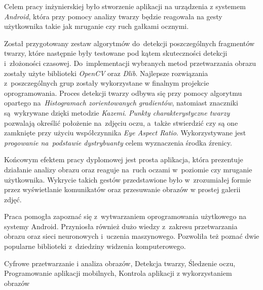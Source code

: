  \cleardoublepage %
 \streszczenie
 
 Celem pracy inżynierskiej było stworzenie aplikacji na urządzenia z systemem \textit{Android}, która przy pomocy analizy twarzy będzie reagowała na gesty użytkownika takie jak mruganie czy ruch gałkami ocznymi.
 
 \par
 
 Został przygotowany zestaw algorytmów do~detekcji poszczególnych fragmentów twarzy, które następnie były testowane pod kątem skuteczności detekcji i~złożoności czasowej. Do~implementacji wybranych metod przetwarzania obrazu zostały użyte biblioteki \textit{OpenCV} oraz \textit{Dlib}.
 Najlepsze rozwiązania z~poszczególnych grup zostały wykorzystane w finalnym projekcie oprogramowania. Proces detekcji twarzy odbywa się przy pomocy algorytmu opartego na~\textit{Histogramach zorientowanych gradientów}, natomiast znaczniki są~wykrywane dzięki metodzie \textit{Kazemi}. \textit{Punkty charakterystyczne twarzy} pozwalają określić położenie na~zdjęciu oczu, a~także stwierdzić czy są one zamknięte przy użyciu współczynnika \textit{Eye Aspect Ratio}. Wykorzystywane jest \textit{progowanie na~podstawie dystrybuanty} celem wyznaczenia środka źrenicy.
 
 \par
 
 Końcowym efektem pracy dyplomowej jest prosta aplikacja, która prezentuje działanie analizy obrazu oraz reaguje na~ruch oczami w~poziomie czy mruganie użytkownika. Wykrycie takich gestów przedstawione było w~zrozumiałej formie przez wyświetlanie komunikatów oraz przesuwanie obrazów w prostej galerii zdjęć. 
 
 \par
 
 Praca pomogła zapoznać się z~wytwarzaniem oprogramowania użytkowego na systemy Android. Przyniosła również dużo wiedzy z~zakresu przetwarzania obrazu oraz sieci neuronowych i~uczenia maszynowego. Pozwoliła też poznać dwie popularne biblioteki z~dziedziny widzenia komputerowego. 

 \slowakluczowe Cyfrowe przetwarzanie i analiza obrazów, Detekcja twarzy, Śledzenie oczu, Programowanie aplikacji mobilnych, Kontrola aplikacji z wykorzystaniem obrazów